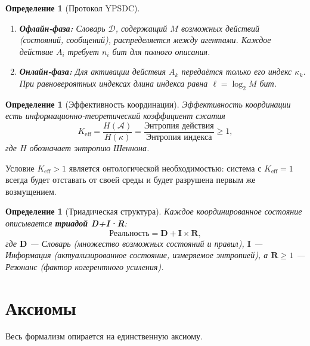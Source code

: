 \documentclass[12pt,a4paper]{article}
\newtheorem{definition}[theorem]{Определение}
\theoremstyle{remark}
\newcommand{\Keff}{K_{\mathrm{eff}}}
\begin{document}
	\begin{definition}[Протокол YPSDC]
		\begin{enumerate}[label=(\roman*)]
			\item \textbf{Офлайн-фаза:} Словарь \(\mathcal{D}\), содержащий \(M\) возможных действий (состояний, сообщений), распределяется между агентами. Каждое действие \(A_i\) требует \(n_i\) бит для полного описания.
			\item \textbf{Онлайн-фаза:} Для активации действия \(A_k\) передаётся только его индекс \(\kappa_k\). При равновероятных индексах длина индекса равна \(\ell = \log_2 M\) бит.
		\end{enumerate}
	\end{definition}
	
	\begin{definition}[Эффективность координации]
		Эффективность координации есть информационно-теоретический коэффициент сжатия
		\begin{equation}
			\Keff = \frac{H(\mathcal{A})}{H(\kappa)} = \frac{\text{Энтропия действия}}{\text{Энтропия индекса}} \ge 1,
			\label{eq:keff}
		\end{equation}
		где \(H\) обозначает энтропию Шеннона.
	\end{definition}
	
	Условие \(K_{\mathrm{eff}} > 1\) является онтологической необходимостью: система с \(K_{\mathrm{eff}} = 1\) всегда будет отставать от своей среды и будет разрушена первым же возмущением.
	
	\begin{definition}[Триадическая структура]
		Каждое координированное состояние описывается \textbf{триадой D+I·R}:
		\[
		\text{Реальность} = \mathbf{D} + \mathbf{I} \times \mathbf{R},
		\]
		где \(\mathbf{D}\) --- Словарь (множество возможных состояний и правил), \(\mathbf{I}\) --- Информация (актуализированное состояние, измеряемое энтропией), а \(\mathbf{R} \ge 1\) --- Резонанс (фактор когерентного усиления).
	\end{definition}
	
	\section{Аксиомы}
	\label{sec:axioms}
	
	Весь формализм опирается на единственную аксиому.
	
\end{document}
